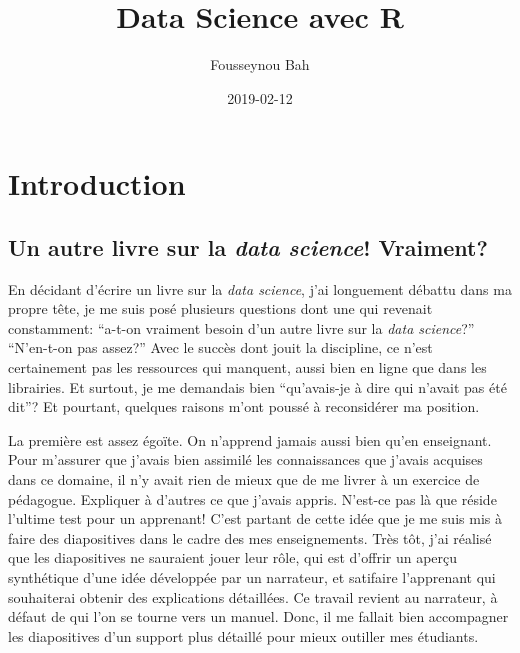 \documentclass[]{book}
\title{Data Science avec R}
\author{Fousseynou Bah}
\date{2019-02-12}
\begin{document}
\maketitle

{
\setcounter{tocdepth}{1}
\tableofcontents
}
\chapter{Introduction}\label{introduction}

\section{\texorpdfstring{Un autre livre sur la \emph{data science}!
Vraiment?}{Un autre livre sur la data science! Vraiment?}}\label{un-autre-livre-sur-la-data-science-vraiment}

En décidant d'écrire un livre sur la \emph{data science}, j'ai
longuement débattu dans ma propre tête, je me suis posé plusieurs
questions dont une qui revenait constamment: ``a-t-on vraiment besoin
d'un autre livre sur la \emph{data science}?'' ``N'en-t-on pas assez?''
Avec le succès dont jouit la discipline, ce n'est certainement pas les
ressources qui manquent, aussi bien en ligne que dans les librairies. Et
surtout, je me demandais bien ``qu'avais-je à dire qui n'avait pas été
dit''? Et pourtant, quelques raisons m'ont poussé à reconsidérer ma
position.

La première est assez égoïte. On n'apprend jamais aussi bien qu'en
enseignant. Pour m'assurer que j'avais bien assimilé les connaissances
que j'avais acquises dans ce domaine, il n'y avait rien de mieux que de
me livrer à un exercice de pédagogue. Expliquer à d'autres ce que
j'avais appris. N'est-ce pas là que réside l'ultime test pour un
apprenant! C'est partant de cette idée que je me suis mis à faire des
diapositives dans le cadre des mes enseignements. Très tôt, j'ai réalisé
que les diapositives ne sauraient jouer leur rôle, qui est d'offrir un
aperçu synthétique d'une idée développée par un narrateur, et satifaire
l'apprenant qui souhaiterai obtenir des explications détaillées. Ce
travail revient au narrateur, à défaut de qui l'on se tourne vers un
manuel. Donc, il me fallait bien accompagner les diapositives d'un
support plus détaillé pour mieux outiller mes étudiants.
\end{document}
